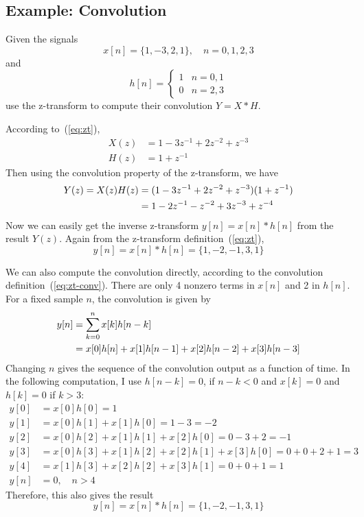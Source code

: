 \subsection{Example: Convolution}

Given the signals 
\begin{equation}
x[n] = \{1, -3, 2, 1\}, \quad n = 0,1,2,3
\end{equation}
and 
\begin{equation}
h[n] = \left\{\begin{array}{ll}
                        1 &  n=0,1\\
                        0 &  n=2,3
          \end{array}\right.
\end{equation}
use the z-transform to compute their convolution $Y = X \ast H$.

According to~(\ref{eq:zt}),
\begin{align}
X(z) &= 1-3z^{-1}+2z^{-2}+z^{-3}\\
H(z) &= 1+z^{-1}
\end{align}
Then using the convolution property of the z-transform, we have 
\begin{align}
Y(z)=X(z)H(z)
&= (1-3z^{-1}+2z^{-2}+z^{-3})(1+z^{-1}) \notag\\
&= 1-2z^{-1}-z^{-2}+3z^{-3}+z^{-4}
\end{align}
Now we can easily get the inverse z-transform $y[n]=x[n] \ast h[n]$ from the
result $Y(z)$. Again from the z-transform
definition~(\ref{eq:zt}),
\begin{equation}
y[n] = x[n] \ast h[n] = \{1,-2, -1, 3, 1\}
\end{equation}

We can also compute the convolution directly, according to the
convolution definition~(\ref{eq:zt-conv}). There are only 4 nonzero
terms in $x[n]$ and 2 in $h[n]$. For a fixed sample $n$, the
convolution is given by
\begin{align}
y[n] &= \sum_{k=0}^{n} x[k] h[n-k] \notag\\
     &= x[0] h[n] + x[1] h[n-1] + x[2] h[n-2] + x[3] h[n-3]
\end{align}
Changing $n$ gives the sequence of the convolution output as a
function of time. In the following computation, I use $h[n-k]=0$,
if $n-k<0$ and $x[k]=0$ and $h[k]=0$ if $k>3$:
\begin{align*}
y[0] &= x[0] h[0] = 1\\
y[1] &= x[0] h[1] + x[1] h[0] = 1-3 = -2\\
y[2] &= x[0] h[2] + x[1] h[1] + x[2] h[0] = 0-3+2 = -1\\
y[3] &= x[0] h[3] + x[1] h[2] + x[2] h[1] +x[3] h[0] = 0+0+2+1 = 3\\
y[4] &= x[1] h[3] + x[2] h[2] + x[3] h[1] = 0+0+1 = 1\\
y[n] &= 0, \quad n>4
\end{align*}
Therefore, this also gives the result
\begin{equation}
y[n] = x[n] \ast h[n] = \{1,-2, -1, 3, 1\}
\end{equation}

